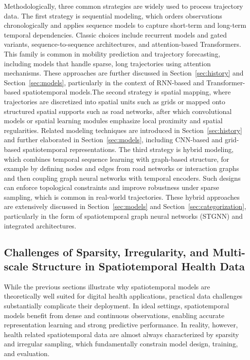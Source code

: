 \documentclass[acmsmall]{acmart}
\begin{document}
Methodologically, three common strategies are widely used to process trajectory data. 
The first strategy is sequential modeling, which orders observations chronologically and applies sequence models to capture short-term and long-term temporal dependencies. Classic choices include recurrent models and gated variants, sequence-to-sequence architectures, and attention-based Transformers. This family is common in mobility prediction and trajectory forecasting, including models that handle sparse, long trajectories using attention mechanisms. These approaches are further discussed in Section~\ref{sec:history} and Section~\ref{sec:models}, particularly in the context of RNN-based and Transformer-based spatiotemporal models.The second strategy is spatial mapping, where trajectories are discretized into spatial units such as grids or mapped onto structured spatial supports such as road networks, after which convolutional models or spatial learning modules emphasize local proximity and spatial regularities. 
Related modeling techniques are introduced in Section~\ref{sec:history} and further elaborated in Section~\ref{sec:models}, including CNN-based and grid-based spatiotemporal representations. The third strategy is hybrid modeling, which combines temporal sequence learning with graph-based structure, for example by defining nodes and edges from road networks or interaction graphs and then coupling graph neural networks with temporal encoders. Such designs can enforce topological constraints and improve robustness under sparse sampling, which is common in real-world trajectories. 
These hybrid approaches are extensively discussed in Section~\ref{sec:models} and Section~\ref{sec:categorization}, particularly in the form of spatiotemporal graph neural networks (STGNN) and integrated architectures.

\subsection{Challenges of Sparsity, Irregularity, and Multi-scale Structure in Spatiotemporal Health Data}
While the previous sections illustrate why spatiotemporal models are theoretically well suited for digital health applications, practical data challenges substantially complicate their deployment. In ideal settings, spatiotemporal models benefit from dense and continuous observations, enabling accurate representation learning and strong predictive performance. In reality, however, health related spatiotemporal data are almost always characterized by sparsity and irregular sampling, which fundamentally constrain model design, training, and evaluation.
\end{document}
